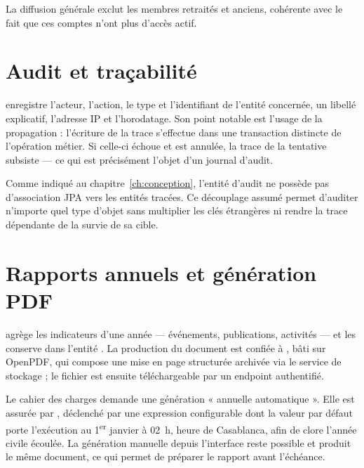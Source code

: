 La diffusion générale exclut les membres retraités et anciens, cohérente avec le fait que
ces comptes n'ont plus d'accès actif.

\section{Audit et traçabilité}

 enregistre l'acteur, l'action, le type et l'identifiant de l'entité
concernée, un libellé explicatif, l'adresse IP et l'horodatage. Son point notable est
l'usage de la propagation  : l'écriture de la trace s'effectue dans une
transaction distincte de l'opération métier. Si celle-ci échoue et est annulée, la trace de
la tentative subsiste --- ce qui est précisément l'objet d'un journal d'audit.

Comme indiqué au chapitre~\ref{ch:conception}, l'entité d'audit ne possède pas
d'association JPA vers les entités tracées. Ce découplage assumé permet d'auditer n'importe
quel type d'objet sans multiplier les clés étrangères ni rendre la trace dépendante de la
survie de sa cible.

\section{Rapports annuels et génération PDF}

 agrège les indicateurs d'une année --- événements, publications,
activités --- et les conserve dans l'entité . La production du document
est confiée à , bâti sur OpenPDF, qui compose une mise en
page structurée archivée via le service de stockage ; le fichier est ensuite téléchargeable
par un endpoint authentifié.

Le cahier des charges demande une génération « annuelle automatique ». Elle est assurée par
, déclenché par une expression  configurable dont la
valeur par défaut porte l'exécution au 1\textsuperscript{er} janvier à 02~h, heure de
Casablanca, afin de clore l'année civile écoulée. La génération manuelle depuis l'interface
reste possible et produit le même document, ce qui permet de préparer le rapport avant
l'échéance.
